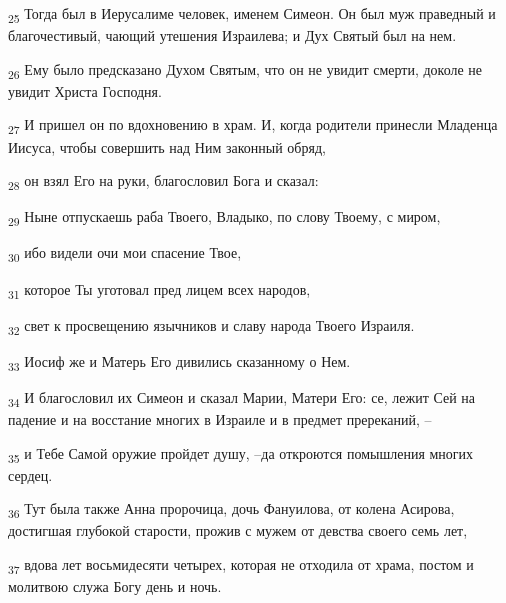 \begin{tcolorbox}
\textsubscript{25} Тогда был в Иерусалиме человек, именем Симеон. Он был муж праведный и благочестивый, чающий утешения Израилева; и Дух Святый был на нем.
\end{tcolorbox}
\begin{tcolorbox}
\textsubscript{26} Ему было предсказано Духом Святым, что он не увидит смерти, доколе не увидит Христа Господня.
\end{tcolorbox}
\begin{tcolorbox}
\textsubscript{27} И пришел он по вдохновению в храм. И, когда родители принесли Младенца Иисуса, чтобы совершить над Ним законный обряд,
\end{tcolorbox}
\begin{tcolorbox}
\textsubscript{28} он взял Его на руки, благословил Бога и сказал:
\end{tcolorbox}
\begin{tcolorbox}
\textsubscript{29} Ныне отпускаешь раба Твоего, Владыко, по слову Твоему, с миром,
\end{tcolorbox}
\begin{tcolorbox}
\textsubscript{30} ибо видели очи мои спасение Твое,
\end{tcolorbox}
\begin{tcolorbox}
\textsubscript{31} которое Ты уготовал пред лицем всех народов,
\end{tcolorbox}
\begin{tcolorbox}
\textsubscript{32} свет к просвещению язычников и славу народа Твоего Израиля.
\end{tcolorbox}
\begin{tcolorbox}
\textsubscript{33} Иосиф же и Матерь Его дивились сказанному о Нем.
\end{tcolorbox}
\begin{tcolorbox}
\textsubscript{34} И благословил их Симеон и сказал Марии, Матери Его: се, лежит Сей на падение и на восстание многих в Израиле и в предмет пререканий, --
\end{tcolorbox}
\begin{tcolorbox}
\textsubscript{35} и Тебе Самой оружие пройдет душу, --да откроются помышления многих сердец.
\end{tcolorbox}
\begin{tcolorbox}
\textsubscript{36} Тут была также Анна пророчица, дочь Фануилова, от колена Асирова, достигшая глубокой старости, прожив с мужем от девства своего семь лет,
\end{tcolorbox}
\begin{tcolorbox}
\textsubscript{37} вдова лет восьмидесяти четырех, которая не отходила от храма, постом и молитвою служа Богу день и ночь.
\end{tcolorbox}
